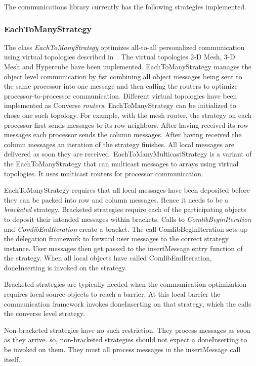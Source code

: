 The communications library currently has the following strategies
implemented.

\subsubsection{EachToManyStrategy}

The class {\em EachToManyStrategy} optimizes all-to-all personalized
communication using virtual topologies described in~\cite{CommlibIPDPS03}. The virtual topologies 
2-D Mesh, 3-D Mesh and Hypercube have been implemented. EachToManyStrategy manages the object
level communication by fist combining all object messages being sent
to the same processor into one message and then calling the routers to
optimize processor-to-processor communication. Different virtual
topologies have been implemented as Converse {\em
routers}. EachToManyStrategy can be initialized to chose one such
topology. For example, with the mesh router, the strategy on each
processor first sends messages to its row neighbors.  After having
received its row messages each processor sends the column
messages. After having received the column messages an iteration of
the strategy finishes. All local messages are delivered as soon they
are received. EachToManyMulticastStrategy is a variant of the
EachToManyStrategy that can multicast messages to arrays using virtual
topologies. It uses multicast routers for processor communication.

\label{sec:bracket}

EachToManyStrategy requires that all local messages have been
deposited before they can be packed into row and column
messages. Hence it needs to be a {\em bracketed} strategy. Bracketed
strategies require each of the participating objects to deposit their
intended messages within brackets. Calls to {\em ComlibBeginIteration}
and {\em ComlibEndIteration} create a bracket. The call
ComlibBeginIteration sets up the delegation framework to forward user
messages to the correct strategy instance. User messages then get
passed to the insertMessage entry function of the strategy.  When all
local objects have called ComlibEndIteration, doneInserting is invoked
on the strategy. 

Bracketed strategies are typically needed when the communication
optimization requires local source objects to reach a barrier. At this
local barrier the communication framework invokes doneInserting on
that strategy, which the calls the converse level strategy.

Non-bracketed strategies have no such restriction. They process
messages as soon as they arrive. so, non-bracketed strategies should
not expect a doneInserting to be invoked on them. They must all
process messages in the insertMessage call itself.

